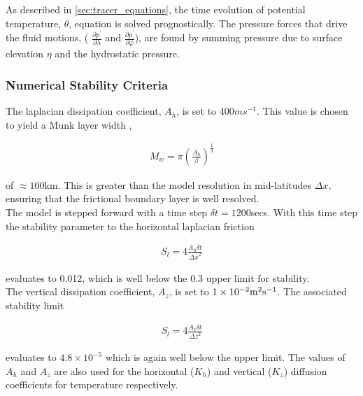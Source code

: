 As described in \ref{sec:tracer_equations}, the time evolution of potential 
temperature, 
$\theta$, equation is solved prognostically.
The pressure forces that drive the fluid motions, (
$\frac{\partial p^{'}}{\partial \lambda}$ and $\frac{\partial p^{'}}{\partial \varphi}$), are found by summing pressure due to surface 
elevation $\eta$ and the hydrostatic pressure.

\subsubsection{Numerical Stability Criteria}

The laplacian dissipation coefficient, $A_{h}$, is set to $400 m s^{-1}$.
This value is chosen to yield a Munk layer width \cite{Adcroft_thesis},

\begin{eqnarray}
\label{EQ:munk_layer}
M_{w} = \pi ( \frac { A_{h} }{ \beta } )^{\frac{1}{3}}
\end{eqnarray}

\noindent  of $\approx 100$km. This is greater than the model
resolution in mid-latitudes $\Delta x$, ensuring that the frictional 
boundary layer is well resolved.
\\

\noindent The model is stepped forward with a 
time step $\delta t=1200$secs. With this time step the stability 
parameter to the horizontal laplacian friction \cite{Adcroft_thesis}

\begin{eqnarray}
\label{EQ:laplacian_stability}
S_{l} = 4 \frac{A_{h} \delta t}{{\Delta x}^2}
\end{eqnarray}

\noindent evaluates to 0.012, which is well below the 0.3 upper limit
for stability. 
\\

\noindent The vertical dissipation coefficient, $A_{z}$, is set to 
$1\times10^{-2} {\rm m}^2{\rm s}^{-1}$. The associated stability limit

\begin{eqnarray}
\label{EQ:laplacian_stability_z}
S_{l} = 4 \frac{A_{z} \delta t}{{\Delta z}^2}
\end{eqnarray}

\noindent evaluates to $4.8 \times 10^{-5}$ which is again well below
the upper limit.
The values of $A_{h}$ and $A_{z}$ are also used for the horizontal ($K_{h}$) 
and vertical ($K_{z}$) diffusion coefficients for temperature respectively.
\\

